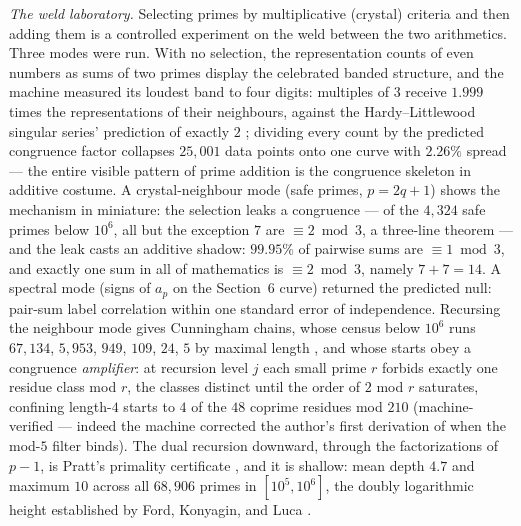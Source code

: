 \documentclass[11pt]{article}
\theoremstyle{remark}
\begin{document}
\emph{The weld laboratory.} Selecting primes by multiplicative (crystal) criteria and then adding
them is a controlled experiment on the weld between the two arithmetics. Three modes were run. With
no selection, the representation counts of even numbers as sums of two primes display the celebrated
banded structure, and the machine measured its loudest band to four digits: multiples of $3$ receive
$1.999$ times the representations of their neighbours, against the Hardy--Littlewood singular
series' prediction of exactly $2$ \cite{HardyLittlewood}; dividing every count by the predicted
congruence factor collapses $25{,}001$ data points onto one curve with $2.26\%$ spread --- the entire
visible pattern of prime addition is the congruence skeleton in additive costume. A crystal-neighbour
mode (safe primes, $p = 2q+1$) shows the mechanism in miniature: the selection leaks a congruence ---
of the $4{,}324$ safe primes below $10^6$, all but the exception $7$ are $\equiv 2 \bmod 3$, a
three-line theorem --- and the leak casts an additive shadow: $99.95\%$ of pairwise sums are
$\equiv 1 \bmod 3$, and exactly one sum in all of mathematics is $\equiv 2 \bmod 3$, namely
$7 + 7 = 14$. A spectral mode (signs of $a_p$ on the Section~6 curve) returned the predicted null:
pair-sum label correlation within one standard error of independence. Recursing the neighbour mode
gives Cunningham chains, whose census below $10^6$ runs $67{,}134$, $5{,}953$, $949$, $109$, $24$,
$5$ by maximal length \cite{Dickson}, and whose starts obey a congruence \emph{amplifier}: at
recursion level $j$ each small prime $r$ forbids exactly one residue class mod $r$, the classes
distinct until the order of $2$ mod $r$ saturates, confining length-$4$ starts to $4$ of the $48$
coprime residues mod $210$ (machine-verified --- indeed the machine corrected the author's first
derivation of when the mod-$5$ filter binds). The dual recursion downward, through the factorizations
of $p-1$, is Pratt's primality certificate \cite{Pratt}, and it is shallow: mean depth $4.7$ and
maximum $10$ across all $68{,}906$ primes in $[10^5, 10^6]$, the doubly logarithmic height
established by Ford, Konyagin, and Luca \cite{FKL}.
\end{document}
